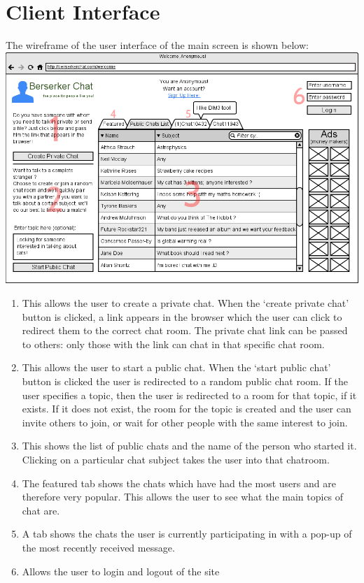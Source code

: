 \documentclass{sig-alt-release2}
\begin{document}
\section{Client Interface}
The wireframe of the user interface of the main screen is shown below:\\

\includegraphics[scale=0.25]{wireframe_num.jpg}

\begin{enumerate}
\item This allows the user to create a private chat. When the `create private chat' button is clicked, a link appears in the browser which the user can click to redirect them to the correct chat room. The private chat link can be passed to others: only those with the link can chat in that specific chat room. 
\item This allows the user to start a public chat. When the `start public chat' button is clicked the user is redirected to a random public chat room. If the user specifies a topic, then the user is redirected to a room for that topic, if it exists. If it does not exist, the room for the topic is created and the user can invite others to join, or wait for other people with the same interest to join.
\item This shows the list of public chats and the name of the person who started it. Clicking on a particular chat subject takes the user into that chatroom. 
\item The featured tab shows the chats which have had the most users and are therefore very popular. This allows the user to see what the main topics of chat are.
\item A tab shows the chats the user is currently participating in with a pop-up of the most recently received message.
\item Allows the user to login and logout of the site
\end{enumerate}
\end{document}
